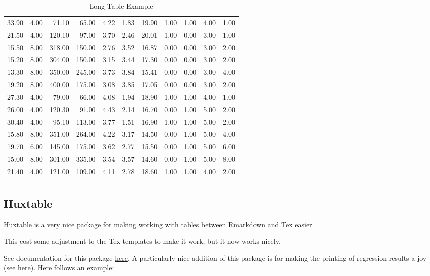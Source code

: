 \documentclass[11pt,preprint, authoryear]{elsarticle}
\numberwithin{equation}{section}
\numberwithin{figure}{section}
\numberwithin{table}{section}
\begin{document}
\begin{longtable}{rrrrrrrrrrr}
  33.90 & 4.00 & 71.10 & 65.00 & 4.22 & 1.83 & 19.90 & 1.00 & 1.00 & 4.00 & 1.00 \\ 
  21.50 & 4.00 & 120.10 & 97.00 & 3.70 & 2.46 & 20.01 & 1.00 & 0.00 & 3.00 & 1.00 \\ 
  15.50 & 8.00 & 318.00 & 150.00 & 2.76 & 3.52 & 16.87 & 0.00 & 0.00 & 3.00 & 2.00 \\ 
  15.20 & 8.00 & 304.00 & 150.00 & 3.15 & 3.44 & 17.30 & 0.00 & 0.00 & 3.00 & 2.00 \\ 
  13.30 & 8.00 & 350.00 & 245.00 & 3.73 & 3.84 & 15.41 & 0.00 & 0.00 & 3.00 & 4.00 \\ 
  19.20 & 8.00 & 400.00 & 175.00 & 3.08 & 3.85 & 17.05 & 0.00 & 0.00 & 3.00 & 2.00 \\ 
  27.30 & 4.00 & 79.00 & 66.00 & 4.08 & 1.94 & 18.90 & 1.00 & 1.00 & 4.00 & 1.00 \\ 
  26.00 & 4.00 & 120.30 & 91.00 & 4.43 & 2.14 & 16.70 & 0.00 & 1.00 & 5.00 & 2.00 \\ 
  30.40 & 4.00 & 95.10 & 113.00 & 3.77 & 1.51 & 16.90 & 1.00 & 1.00 & 5.00 & 2.00 \\ 
  15.80 & 8.00 & 351.00 & 264.00 & 4.22 & 3.17 & 14.50 & 0.00 & 1.00 & 5.00 & 4.00 \\ 
  19.70 & 6.00 & 145.00 & 175.00 & 3.62 & 2.77 & 15.50 & 0.00 & 1.00 & 5.00 & 6.00 \\ 
  15.00 & 8.00 & 301.00 & 335.00 & 3.54 & 3.57 & 14.60 & 0.00 & 1.00 & 5.00 & 8.00 \\ 
  21.40 & 4.00 & 121.00 & 109.00 & 4.11 & 2.78 & 18.60 & 1.00 & 1.00 & 4.00 & 2.00 \\ 
   \bottomrule
\caption{Long Table Example} 
\end{longtable}

\endgroup

\hfill

\subsection{Huxtable}\label{huxtable}

Huxtable is a very nice package for making working with tables between
Rmarkdown and Tex easier.

This cost some adjustment to the Tex templates to make it work, but it
now works nicely.

See documentation for this package
\href{https://hughjonesd.github.io/huxtable/huxtable.html}{here}. A
particularly nice addition of this package is for making the printing of
regression results a joy (see
\href{https://hughjonesd.github.io/huxtable/huxtable.html\#creating-a-regression-table}{here}).
Here follows an example:
\end{document}
